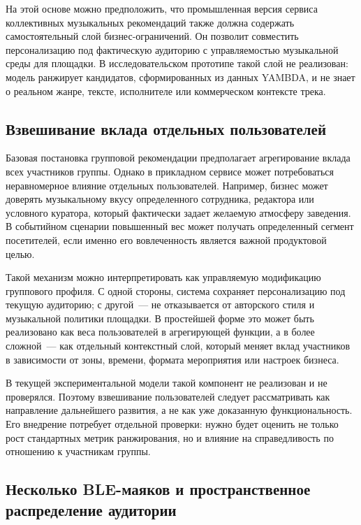 На этой основе можно предположить, что промышленная версия сервиса коллективных музыкальных рекомендаций также должна содержать самостоятельный слой бизнес-ограничений. Он позволит совместить персонализацию под фактическую аудиторию с управляемостью музыкальной среды для площадки. В исследовательском прототипе такой слой не реализован: модель ранжирует кандидатов, сформированных из данных YAMBDA, и не знает о реальном жанре, тексте, исполнителе или коммерческом контексте трека.

\subsection{Взвешивание вклада отдельных пользователей}
\label{subsec:ch6:user-weights}

Базовая постановка групповой рекомендации предполагает агрегирование вклада всех участников группы. Однако в прикладном сервисе может потребоваться неравномерное влияние отдельных пользователей. Например, бизнес может доверять музыкальному вкусу определенного сотрудника, редактора или условного куратора, который фактически задает желаемую атмосферу заведения. В событийном сценарии повышенный вес может получать определенный сегмент посетителей, если именно его вовлеченность является важной продуктовой целью.

Такой механизм можно интерпретировать как управляемую модификацию группового профиля. С одной стороны, система сохраняет персонализацию под текущую аудиторию; с другой~--- не отказывается от авторского стиля и музыкальной политики площадки. В простейшей форме это может быть реализовано как веса пользователей в агрегирующей функции, а в более сложной~--- как отдельный контекстный слой, который меняет вклад участников в зависимости от зоны, времени, формата мероприятия или настроек бизнеса.

В текущей экспериментальной модели такой компонент не реализован и не проверялся. Поэтому взвешивание пользователей следует рассматривать как направление дальнейшего развития, а не как уже доказанную функциональность. Его внедрение потребует отдельной проверки: нужно будет оценить не только рост стандартных метрик ранжирования, но и влияние на справедливость по отношению к участникам группы.

\subsection{Несколько BLE-маяков и пространственное распределение аудитории}
\label{subsec:ch6:multi-ble}

